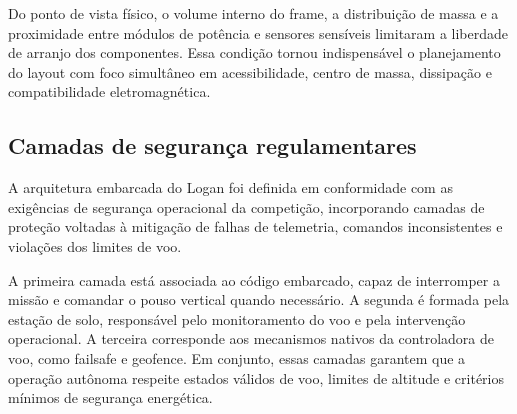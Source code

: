 Do ponto de vista físico, o volume interno do frame, a distribuição de massa e a proximidade entre módulos de potência e sensores sensíveis limitaram a liberdade de arranjo dos componentes. Essa condição tornou indispensável o planejamento do layout com foco simultâneo em acessibilidade, centro de massa, dissipação e compatibilidade eletromagnética.

\subsection{Camadas de segurança regulamentares}

A arquitetura embarcada do Logan foi definida em conformidade com as exigências de segurança operacional da competição, incorporando camadas de proteção voltadas à mitigação de falhas de telemetria, comandos inconsistentes e violações dos limites de voo.

A primeira camada está associada ao código embarcado, capaz de interromper a missão e comandar o pouso vertical quando necessário. A segunda é formada pela estação de solo, responsável pelo monitoramento do voo e pela intervenção operacional. A terceira corresponde aos mecanismos nativos da controladora de voo, como failsafe e geofence. Em conjunto, essas camadas garantem que a operação autônoma respeite estados válidos de voo, limites de altitude e critérios mínimos de segurança energética.
 
